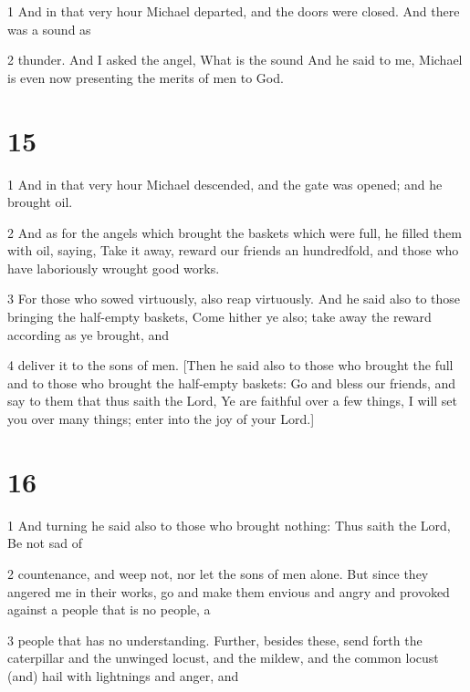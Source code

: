 \par 1 And in that very hour Michael departed, and the doors were closed. And there was a sound as

\par 2 thunder. And I asked the angel, What is the sound And he said to me, Michael is even now presenting the merits of men to God.

\chapter{15}

\par 1 And in that very hour Michael descended, and the gate was opened; and he brought oil.

\par 2 And as for the angels which brought the baskets which were full, he filled them with oil, saying, Take it away, reward our friends an hundredfold, and those who have laboriously wrought good works.

\par 3 For those who sowed virtuously, also reap virtuously. And he said also to those bringing the half-empty baskets, Come hither ye also; take away the reward according as ye brought, and

\par 4 deliver it to the sons of men. [Then he said also to those who brought the full and to those who brought the half-empty baskets: Go and bless our friends, and say to them that thus saith the Lord, Ye are faithful over a few things, I will set you over many things; enter into the joy of your Lord.]

\chapter{16}

\par 1 And turning he said also to those who brought nothing: Thus saith the Lord, Be not sad of

\par 2 countenance, and weep not, nor let the sons of men alone. But since they angered me in their works, go and make them envious and angry and provoked against a people that is no people, a

\par 3 people that has no understanding. Further, besides these, send forth the caterpillar and the unwinged locust, and the mildew, and the common locust (and) hail with lightnings and anger, and

